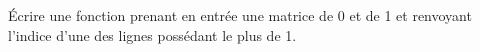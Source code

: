 \documentclass{magnolia}
\begin{document}
\begin{exoUnique}
\exo Écrire une fonction prenant en entrée une matrice de 0 et de 1
  et renvoyant l'indice d'une des lignes possédant le plus de 1.
\end{exoUnique}




                
 
 
 
                









\end{document}
